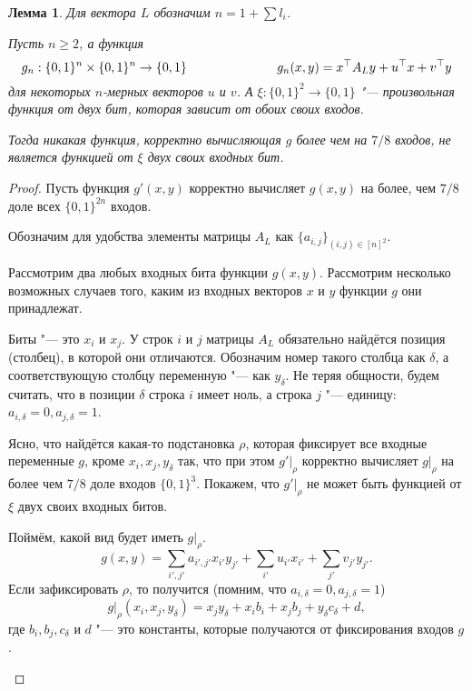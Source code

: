 \documentclass[oneside, a4paper]{article}
\newtheorem{lemma}{Лемма}
\theoremstyle{plain}
\theoremstyle{remark}
\begin{document}
\begin{lemma} \label{tough}
Для вектора $L$ обозначим $n = 1 + \sum l_i$.

Пусть $n \geq 2$, а функция
\[
g_n : \{0, 1\}^n \times \{0, 1\}^n \to \{0, 1\} \hspace{2.5cm}
g_n(x, y) = x^\top A_L y + u^\top x + v^\top y
\]
для некоторых $n$-мерных векторов $u$ и $v$. А $\xi : \{0, 1\}^2 \to \{0, 1\}$
"--- произвольная функция от двух бит, которая зависит от обоих своих входов.

Тогда никакая функция, корректно вычисляющая $g$ более чем на $7/8$ входов, не
является функцией от $\xi$ двух своих входных бит.
\end{lemma}

\begin{proof}
Пусть функция $g'(x, y)$ корректно вычисляет $g(x, y)$ на более, чем $7/8$ доле
всех $\{0, 1\}^{2n}$ входов.

Обозначим для удобства элементы матрицы $A_L$ как $\{a_{i, j}\}_{(i, j) \in {[n]^2}}$.

Рассмотрим два любых входных бита функции $g(x, y)$. Рассмотрим несколько
возможных случаев того, каким из входных векторов $x$ и $y$ функции $g$ они
принадлежат.
\begin{description}
\item{Биты "--- это $x_i$ и $x_j$.} У строк $i$ и $j$ матрицы $A_L$ обязательно
найдётся позиция (столбец), в которой они отличаются. Обозначим номер такого
столбца как $\delta$, а соответствующую столбцу переменную "--- как $y_\delta$.
Не теряя общности, будем считать, что в позиции $\delta$ строка $i$ имеет ноль,
а строка $j$ "--- единицу: $a_{i, \delta} = 0, a_{j, \delta} = 1$.

Ясно, что найдётся какая-то подстановка $\rho$, которая фиксирует все входные
переменные $g$, кроме $x_i, x_j, y_\delta$ так, что при этом $g' \rvert _ \rho$
корректно вычисляет $g \rvert _ \rho$ на более чем $7/8$ доле входов $\{0,
1\}^3$. Покажем, что $g' \rvert _ \rho$ не может быть функцией от $\xi$ двух своих
входных битов.

Поймём, какой вид будет иметь $g \rvert _ \rho$. 
\[
g(x, y) = \sum_{i', j'} a_{i', j'} x_{i'} y_{j'} + \sum_{i'} u_{i'} x_{i'} + \sum_{j'} v_{j'} y_{j'}.
\]
Если зафиксировать $\rho$, то получится (помним, что $a_{i, \delta} = 0, a_{j, \delta} = 1$)
\[
g \rvert _ \rho (x_i, x_j, y_\delta) = x_j y_\delta + x_i b_i + x_j b_j + y_\delta c_\delta + d,
\]
где $b_i, b_j, c_\delta$ и $d$ "--- это константы, которые получаются от
фиксирования входов $g$.


\end{description}
\end{proof}
\end{document}

